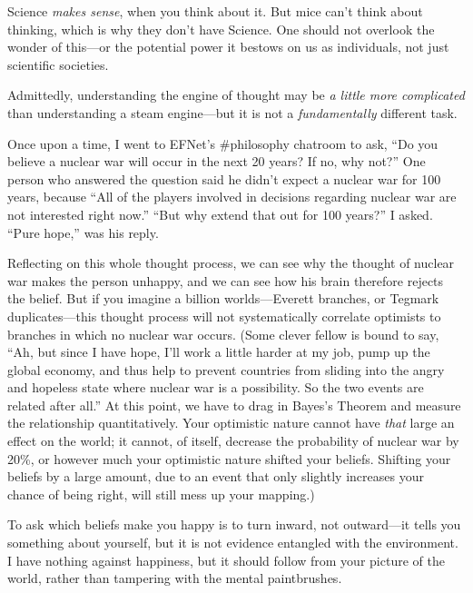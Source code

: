 {
 Science \textit{makes sense}, when you think about it. But mice
can't think about thinking, which is why they
don't have Science. One should not overlook the wonder
of this---or the potential power it bestows on us as individuals, not
just scientific societies.}

{
 Admittedly, understanding the engine of thought may be \textit{a
little more complicated} than understanding a steam engine---but it is
not a \textit{fundamentally} different task.}

{
 Once upon a time, I went to EFNet's \#philosophy
chatroom to ask, ``Do you believe a nuclear war will
occur in the next 20 years? If no, why not?'' One
person who answered the question said he didn't expect
a nuclear war for 100 years, because ``All of the
players involved in decisions regarding nuclear war are not interested
right now.'' ``But why extend that
out for 100 years?'' I asked. ``Pure
hope,'' was his reply.}

{
 Reflecting on this whole thought process, we can see why the
thought of nuclear war makes the person unhappy, and we can see how his
brain therefore rejects the belief. But if you imagine a billion
worlds---Everett branches, or Tegmark
duplicates---this thought process will not
systematically correlate optimists to branches in which no nuclear war
occurs. (Some clever fellow is bound to say, ``Ah, but
since I have hope, I'll work a little harder at my job,
pump up the global economy, and thus help to prevent countries from
sliding into the angry and hopeless state where nuclear war is a
possibility. So the two events are related after
all.'' At this point, we have to drag in
Bayes's Theorem and measure the relationship
quantitatively. Your optimistic nature cannot have \textit{that} large
an effect on the world; it cannot, of itself, decrease the probability
of nuclear war by 20\%, or however much your optimistic nature shifted
your beliefs. Shifting your beliefs by a large amount, due to an event
that only slightly increases your chance of being right, will still
mess up your mapping.)}

{
 To ask which beliefs make you happy is to turn inward, not
outward---it tells you something about yourself, but it is not evidence
entangled with the environment. I have nothing against happiness, but
it should follow from your picture of the world, rather than tampering
with the mental paintbrushes.}

